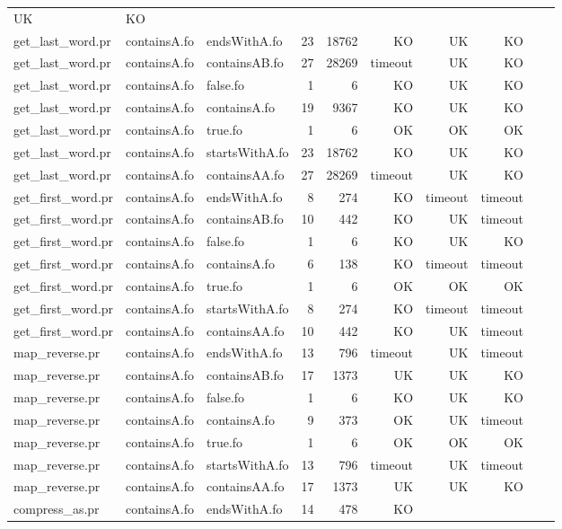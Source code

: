 \begin{tabular}{l|l|l|r|r|r|r|r|r|r}
UK & KO \\
get\_last\_word.pr & containsA.fo & endsWithA.fo & 23 & 18762 & KO & 
UK & KO \\
get\_last\_word.pr & containsA.fo & containsAB.fo & 27 & 28269 & timeout & 
UK & KO \\
get\_last\_word.pr & containsA.fo & false.fo & 1 & 6 & KO & 
UK & KO \\
get\_last\_word.pr & containsA.fo & containsA.fo & 19 & 9367 & KO & 
UK & KO \\
get\_last\_word.pr & containsA.fo & true.fo & 1 & 6 & OK & 
OK & OK \\
get\_last\_word.pr & containsA.fo & startsWithA.fo & 23 & 18762 & KO & 
UK & KO \\
get\_last\_word.pr & containsA.fo & containsAA.fo & 27 & 28269 & timeout & 
UK & KO \\
get\_first\_word.pr & containsA.fo & endsWithA.fo & 8 & 274 & KO & 
timeout & timeout \\
get\_first\_word.pr & containsA.fo & containsAB.fo & 10 & 442 & KO & 
UK & timeout \\
get\_first\_word.pr & containsA.fo & false.fo & 1 & 6 & KO & 
UK & KO \\
get\_first\_word.pr & containsA.fo & containsA.fo & 6 & 138 & KO & 
timeout & timeout \\
get\_first\_word.pr & containsA.fo & true.fo & 1 & 6 & OK & 
OK & OK \\
get\_first\_word.pr & containsA.fo & startsWithA.fo & 8 & 274 & KO & 
timeout & timeout \\
get\_first\_word.pr & containsA.fo & containsAA.fo & 10 & 442 & KO & 
UK & timeout \\
map\_reverse.pr & containsA.fo & endsWithA.fo & 13 & 796 & timeout & 
UK & timeout \\
map\_reverse.pr & containsA.fo & containsAB.fo & 17 & 1373 & UK & 
UK & KO \\
map\_reverse.pr & containsA.fo & false.fo & 1 & 6 & KO & 
UK & KO \\
map\_reverse.pr & containsA.fo & containsA.fo & 9 & 373 & OK & 
UK & timeout \\
map\_reverse.pr & containsA.fo & true.fo & 1 & 6 & OK & 
OK & OK \\
map\_reverse.pr & containsA.fo & startsWithA.fo & 13 & 796 & timeout & 
UK & timeout \\
map\_reverse.pr & containsA.fo & containsAA.fo & 17 & 1373 & UK & 
UK & KO \\
compress\_as.pr & containsA.fo & endsWithA.fo & 14 & 478 & KO & 

\end{tabular}
